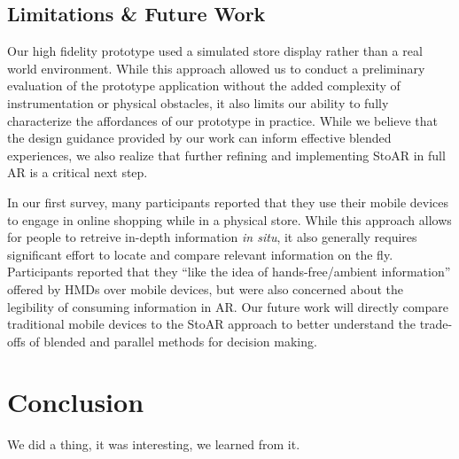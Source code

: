 \subsection{Limitations \& Future Work}
Our high fidelity prototype used a simulated store display rather than a real world environment.  While this approach allowed us to conduct a preliminary evaluation of the prototype application without the added complexity of instrumentation or physical obstacles, it also limits our ability to fully characterize the affordances of our prototype in practice.  
While we believe that the design guidance provided by our work can inform effective blended experiences, we also realize that further refining and implementing StoAR in full AR is a critical next step. 

In our first survey, many participants reported that they use their mobile devices to engage in online shopping while in a physical store. While this approach allows for people to retreive in-depth information \emph{in situ}, it also generally requires significant effort to locate and compare relevant information on the fly. Participants reported that they ``like the idea of hands-free/ambient information'' offered by HMDs over mobile devices, but were also concerned about the legibility of consuming information in AR. Our future work will directly compare traditional mobile devices to the StoAR approach to better understand the trade-offs of blended and parallel methods for decision making. 

\section{Conclusion}
We did a thing, it was interesting, we learned from it.